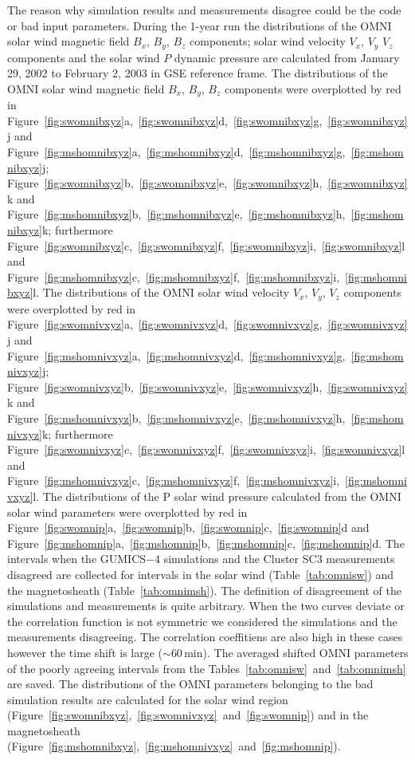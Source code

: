 \documentclass[linenumbers,draft]{agujournal}
\begin{document}
The reason why simulation results and measurements disagree could be the code or bad input parameters. During the 1-year run the distributions of the OMNI solar wind magnetic field $B_{x}$, $B_{y}$, $B_{z}$ components; solar wind velocity $V_{x}$, $V_{y}$ $V_{z}$ components and the solar wind $P$ dynamic pressure are calculated from January 29, 2002 to February 2, 2003 in GSE reference frame. The distributions of the OMNI solar wind magnetic field $B_{x}$, $B_{y}$, $B_{z}$ components were overplotted by red in Figure~\ref{fig:swomnibxyz}a,~\ref{fig:swomnibxyz}d,~\ref{fig:swomnibxyz}g,~\ref{fig:swomnibxyz}j and Figure~\ref{fig:mshomnibxyz}a,~\ref{fig:mshomnibxyz}d,~\ref{fig:mshomnibxyz}g,~\ref{fig:mshomnibxyz}j; Figure~\ref{fig:swomnibxyz}b,~\ref{fig:swomnibxyz}e,~\ref{fig:swomnibxyz}h,~\ref{fig:swomnibxyz}k and Figure~\ref{fig:mshomnibxyz}b,~\ref{fig:mshomnibxyz}e,~\ref{fig:mshomnibxyz}h,~\ref{fig:mshomnibxyz}k; furthermore Figure~\ref{fig:swomnibxyz}c,~\ref{fig:swomnibxyz}f,~\ref{fig:swomnibxyz}i,~\ref{fig:swomnibxyz}l and Figure~\ref{fig:mshomnibxyz}c,~\ref{fig:mshomnibxyz}f,~\ref{fig:mshomnibxyz}i,~\ref{fig:mshomnibxyz}l. The distributions of the OMNI solar wind velocity $V_{x}$, $V_{y}$, $V_{z}$ components were overplotted by red in Figure~\ref{fig:swomnivxyz}a,~\ref{fig:swomnivxyz}d,~\ref{fig:swomnivxyz}g,~\ref{fig:swomnivxyz}j and Figure~\ref{fig:mshomnivxyz}a,~\ref{fig:mshomnivxyz}d,~\ref{fig:mshomnivxyz}g,~\ref{fig:mshomnivxyz}j; Figure~\ref{fig:swomnivxyz}b,~\ref{fig:swomnivxyz}e,~\ref{fig:swomnivxyz}h,~\ref{fig:swomnivxyz}k and Figure~\ref{fig:mshomnivxyz}b,~\ref{fig:mshomnivxyz}e,~\ref{fig:mshomnivxyz}h,~\ref{fig:mshomnivxyz}k; furthermore Figure~\ref{fig:swomnivxyz}c,~\ref{fig:swomnivxyz}f,~\ref{fig:swomnivxyz}i,~\ref{fig:swomnivxyz}l and Figure~\ref{fig:mshomnivxyz}c,~\ref{fig:mshomnivxyz}f,~\ref{fig:mshomnivxyz}i,~\ref{fig:mshomnivxyz}l. The distributions of the P solar wind pressure calculated from the OMNI solar wind parameters were overplotted by red in Figure~\ref{fig:swomnip}a,~\ref{fig:swomnip}b,~\ref{fig:swomnip}c,~\ref{fig:swomnip}d and Figure~\ref{fig:mshomnip}a,~\ref{fig:mshomnip}b,~\ref{fig:mshomnip}c,~\ref{fig:mshomnip}d. The intervals when the GUMICS$-$4 simulations and the Cluster SC3 measurements disagreed are collected for intervals in the solar wind (Table~\ref{tab:omnisw}) and the magnetosheath (Table~\ref{tab:omnimsh}). The definition of disagreement of the simulations and measurements is quite arbitrary. When the two curves deviate or the correlation function is not symmetric we considered the simulations and the measurements disagreeing. The correlation coeffitiens are also high in these cases however the time shift is large ($\sim$60\,min). The averaged shifted OMNI parameters of the poorly agreeing intervals from the Tables~\ref{tab:omnisw}~and~\ref{tab:omnimsh} are saved. The distributions of the OMNI parameters belonging to the bad simulation results are calculated for the solar wind region (Figure~\ref{fig:swomnibxyz},~\ref{fig:swomnivxyz}~and~\ref{fig:swomnip}) and in the magnetosheath (Figure~\ref{fig:mshomnibxyz},~\ref{fig:mshomnivxyz}~and~\ref{fig:mshomnip}).
\end{document}
